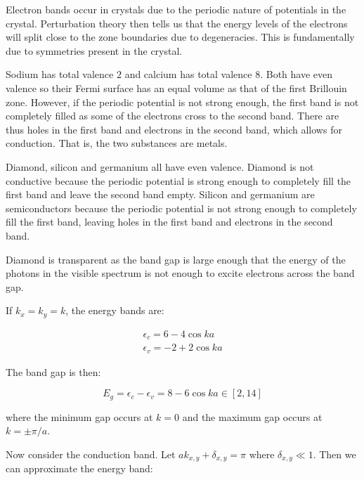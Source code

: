 \documentclass[12pt]{article}
\begin{document}


Electron bands occur in crystals due to the periodic nature of potentials in the crystal. Perturbation theory then tells us that the energy levels of the electrons will split close to the zone boundaries due to degeneracies. This is fundamentally due to symmetries present in the crystal.

Sodium has total valence $2$ and calcium has total valence $8$. Both have even valence so their Fermi surface has an equal volume as that of the first Brillouin zone. However, if the periodic potential is not strong enough, the first band is not completely filled as some of the electrons cross to the second band. There are thus holes in the first band and electrons in the second band, which allows for conduction. That is, the two substances are metals.

Diamond, silicon and germanium all have even valence. Diamond is not conductive because the periodic potential is strong enough to completely fill the first band and leave the second band empty. Silicon and germanium are semiconductors because the periodic potential is not strong enough to completely fill the first band, leaving holes in the first band and electrons in the second band.

Diamond is transparent as the band gap is large enough that the energy of the photons in the visible spectrum is not enough to excite electrons across the band gap.

If $k_{x} = k_{y} = k$, the energy bands are:

\begin{equation}
    \begin{split}
        \epsilon_{c} = 6 - 4 \cos{ka} \\
        \epsilon_{v} = -2 + 2 \cos{ka}
    \end{split}
\end{equation}

The band gap is then:

\begin{equation}
    E_{g} = \epsilon_{c} - \epsilon_{v} = 8 - 6 \cos{ka} \in [2, 14]
\end{equation}

where the minimum gap occurs at $k = 0$ and the maximum gap occurs at $k = \pm \pi/a$.

Now consider the conduction band. Let $ak_{x, y} + \delta_{x, y} = \pi$ where $\delta_{x, y} \ll 1$. Then we can approximate the energy band:
\end{document}
